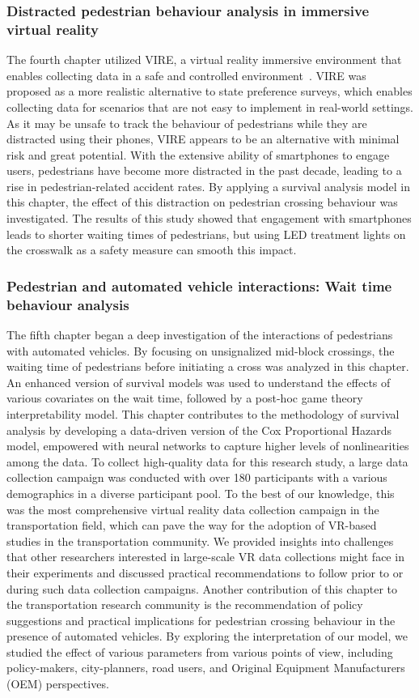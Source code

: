 \subsubsection*{Distracted pedestrian behaviour analysis in immersive virtual reality}
The fourth chapter utilized VIRE, a virtual reality immersive environment that enables collecting data in a safe and controlled environment~\cite{farooqvire}. VIRE was proposed as a more realistic alternative to state preference surveys, which enables collecting data for scenarios that are not easy to implement in real-world settings. As it may be unsafe to track the behaviour of pedestrians while they are distracted using their phones, VIRE appears to be an alternative with minimal risk and great potential. With the extensive ability of smartphones to engage users, pedestrians have become more distracted in the past decade, leading to a rise in pedestrian-related accident rates. By applying a survival analysis model in this chapter, the effect of this distraction on pedestrian crossing behaviour was investigated. The results of this study showed that engagement with smartphones leads to shorter waiting times of pedestrians, but using LED treatment lights on the crosswalk as a safety measure can smooth this impact.

\subsubsection*{Pedestrian and automated vehicle interactions: Wait time behaviour analysis}
The fifth chapter began a deep investigation of the interactions of pedestrians with automated vehicles. By focusing on unsignalized mid-block crossings, the waiting time of pedestrians before initiating a cross was analyzed in this chapter. An enhanced version of survival models was used to understand the effects of various covariates on the wait time, followed by a post-hoc game theory interpretability model. This chapter contributes to the methodology of survival analysis by developing a data-driven version of the Cox Proportional Hazards model, empowered with neural networks to capture higher levels of nonlinearities among the data. To collect high-quality data for this research study, a large data collection campaign was conducted with over 180 participants with a various demographics in a diverse participant pool. To the best of our knowledge, this was the most comprehensive virtual reality data collection campaign in the transportation field, which can pave the way for the adoption of VR-based studies in the transportation community. We provided insights into challenges that other researchers interested in large-scale VR data collections might face in their experiments and discussed practical recommendations to follow prior to or during such data collection campaigns. Another contribution of this chapter to the transportation research community is the recommendation of policy suggestions and practical implications for pedestrian crossing behaviour in the presence of automated vehicles. By exploring the interpretation of our model, we studied the effect of various parameters from various points of view, including policy-makers, city-planners, road users, and Original Equipment Manufacturers (OEM) perspectives.


